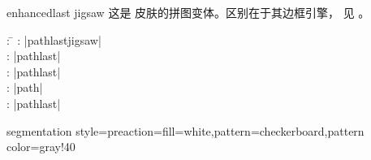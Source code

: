 \clearpage
\begin{docSkin}{enhancedlast jigsaw}
  这是  皮肤的拼图变体。区别在于其边框引擎，
  见 。
\begin{tcolorbox}[skintable=enhancedlast]
  \begin{tabbing}
    : \=\kill
    :           \> |pathlastjigsaw|\\
    : \> |pathlast|\\ 
    :        \> |pathlast|\\
    :    \> |path|\\
    :           \> |pathlast|
  \end{tabbing}
\end{tcolorbox}
\end{docSkin}


\begin{dispExample*}{segmentation style={preaction={fill=white},pattern=checkerboard,pattern color=gray!40}}
\end{dispExample*}



\clearpage
